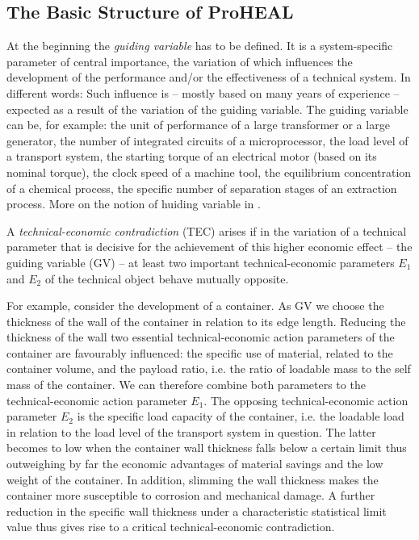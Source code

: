 \documentclass[11pt,a4paper]{article}
\begin{document}
\subsection{The Basic Structure of ProHEAL}
  
At the beginning the \emph{guiding variable} has to be defined. It is a
system-specific parameter of central importance, the variation of which
influences the development of the performance and/or the effectiveness of a
technical system. In different words: Such influence is -- mostly based on
many years of experience -- expected as a result of the variation of the
guiding variable. The guiding variable can be, for example: the unit of
performance of a large transformer or a large generator, the number of
integrated circuits of a microprocessor, the load level of a transport system,
the starting torque of an electrical motor (based on its nominal torque), the
clock speed of a machine tool, the equilibrium concentration of a chemical
process, the specific number of separation stages of an extraction process.
More on the notion of huiding variable in \cite[(2.3.4)]{RM-21}.

A \emph{technical-economic contradiction} (TEC) arises if in the variation of
a technical parameter that is decisive for the achievement of this higher
economic effect -- the guiding variable (GV) -- at least two important
technical-economic parameters $E_1$ and $E_2$ of the technical object behave
mutually opposite.

For example, consider the development of a container. As GV we choose the
thickness of the wall of the container in relation to its edge length.
Reducing the thickness of the wall two essential technical-economic action
parameters of the container are favourably influenced: the specific use of
material, related to the container volume, and the payload ratio, i.e. the
ratio of loadable mass to the self mass of the container.  We can therefore
combine both parameters to the technical-economic action parameter $E_1$. The
opposing technical-economic action parameter $E_2$ is the specific load
capacity of the container, i.e. the loadable load in relation to the load
level of the transport system in question. The latter becomes to low when the
container wall thickness falls below a certain limit thus outweighing by far
the economic advantages of material savings and the low weight of the
container. In addition, slimming the wall thickness makes the container more
susceptible to corrosion and mechanical damage. A further reduction in the
specific wall thickness under a characteristic statistical limit value thus
gives rise to a critical technical-economic contradiction.
\end{document}
